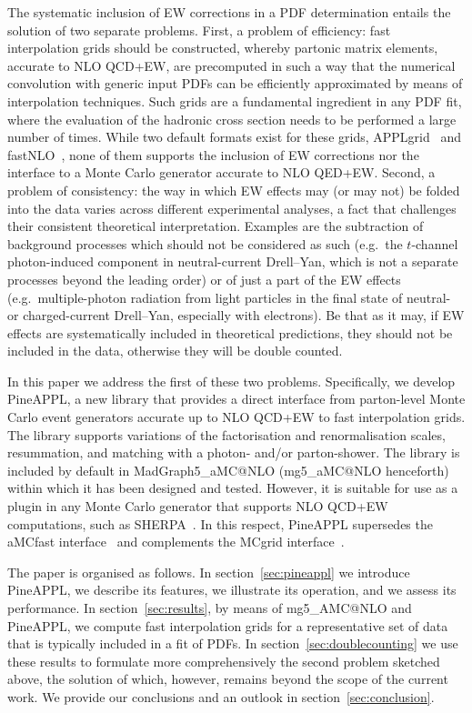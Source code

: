 The systematic inclusion of EW corrections in a PDF determination entails
the solution of two separate problems. First, a problem of efficiency:
fast interpolation grids should be constructed, whereby partonic matrix 
elements, accurate to NLO QCD+EW, are precomputed in such a way that the 
numerical convolution with generic input PDFs can be efficiently approximated
by means of interpolation techniques. Such grids are a fundamental ingredient
in any PDF fit, where the evaluation of the hadronic cross section needs to 
be performed a large number of times. While two default formats exist for
these grids, {\sc APPLgrid}~\cite{Carli:2010rw} and 
{\sc fastNLO}~\cite{Kluge:2006xs}, none of them supports the inclusion of EW
corrections nor the interface to a Monte Carlo generator accurate to 
NLO QED+EW. Second, a problem of consistency: the way in which EW effects may
(or may not) be folded into the data varies across different experimental 
analyses, a fact that challenges their consistent theoretical interpretation. 
Examples are the subtraction of background processes which should not be 
considered as such (e.g.\ the $t$-channel photon-induced component in
neutral-current Drell--Yan, which is not a separate processes beyond the leading
order) or of just a part of the EW effects (e.g.\ multiple-photon
radiation from light particles in the final state of neutral- or charged-current
Drell--Yan, especially with electrons). Be that as it may, if EW effects are
systematically included in theoretical predictions, they should not be included 
in the data, otherwise they will be double counted.

In this paper we address the first of these two problems. Specifically, 
we develop {\sc PineAPPL}, a new library that provides a direct interface 
from parton-level Monte Carlo event generators accurate up to NLO QCD+EW to
fast interpolation grids. The library supports variations of the factorisation
and renormalisation scales, resummation, and matching with a photon- and/or
parton-shower. The library is included by default in 
{\sc MadGraph5\_aMC@NLO} ({\sc mg5\_aMC@NLO} henceforth) within which it has 
been designed and tested. However, it is suitable for use as a plugin in any 
Monte Carlo generator that supports NLO QCD+EW computations, such as 
{\sc SHERPA}~\cite{Biedermann:2017yoi}. In this respect, {\sc PineAPPL}
supersedes the {\sc aMCfast} interface~\cite{Bertone:2014zva} and complements
the {\sc MCgrid} interface~\cite{DelDebbio:2013kxa,Bothmann:2015dba}.

The paper is organised as follows. In section~\ref{sec:pineappl} we introduce
{\sc PineAPPL}, we describe its features, we illustrate its operation, and we
assess its performance. In section~\ref{sec:results}, by means of
{\sc mg5\_AMC@NLO} and {\sc PineAPPL}, we compute fast interpolation grids for 
a representative set of data that is typically included in a fit of PDFs.
In section~\ref{sec:doublecounting} we use these results to formulate more
comprehensively the second problem sketched above, the solution of which, 
however, remains beyond the scope of the current work. We provide our
conclusions and an outlook in section~\ref{sec:conclusion}.

